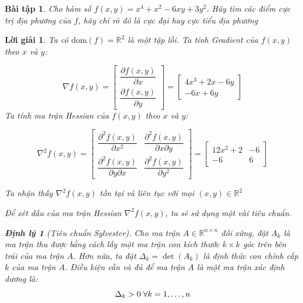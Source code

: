 \documentclass[14pt, a4paper]{article}
\newtheorem{dl}{Định lý}
\theoremstyle{sltheorem}
\newtheorem{baitap}{Bài tập}
\theoremstyle{soltheorem}
\newtheorem*{loigiai}{Lời giải}
\begin{document}
    \begin{baitap}
        Cho hàm số $f(x, y) = x^4 + x^2 - 6xy + 3y^2$. Hãy tìm các điểm cực trị địa phương của $f$, hãy chỉ rõ đó là cực đại hay cực tiểu địa phương
    \end{baitap}

    \begin{loigiai}
        Ta có $\mathrm{dom}(f)=\mathbb{R}^2$ là một tập lồi. Ta tính Gradient của $f(x, y)$ theo $x$ và $y$:

        \begin{equation*}
            \nabla f(x, y) = \begin{bmatrix} \dfrac{\partial f(x, y)}{\partial x} \\ \dfrac{\partial f(x, y)}{\partial y}\end{bmatrix} = \begin{bmatrix} 4x^3 + 2x - 6y \\ -6x + 6y \end{bmatrix}
        \end{equation*}
        Ta tính ma trận Hessian của $f(x, y)$ theo $x$ và $y$:

        \begin{equation*}
            \nabla^2 f(x,y)=\begin{bmatrix} \dfrac{\partial^2 f(x, y)}{\partial x^2} & \dfrac{\partial^2 f(x, y)}{\partial x\partial y} \\ \dfrac{\partial^2 f(x, y)}{\partial y \partial x } & \dfrac{\partial^2 f(x, y)}{\partial y^2 } \end{bmatrix}=\begin{bmatrix} 12x^2 + 2 & -6 \\ -6 & 6 \end{bmatrix}
        \end{equation*}

        Ta nhận thấy $\nabla^2 f(x, y)$ tồn tại và liên tục với mọi $(x, y) \in \mathbb{R}^{2}$

        Để xét dấu của ma trận Hessian $\nabla^2 f(x, y)$, ta sẽ sử dụng một vài tiêu chuẩn.

        \begin{dl}[Tiêu chuẩn Sylvester] \label{dl:Sylvester}
            Cho ma trận $A \in \mathbb{R}^{n \times n}$ đối xứng, 
            đặt $A_k$ là ma trận thu được bằng cách lấy một ma trận con kích thước $k\times k$ góc trên bên trái của ma trận $A$. 
            Hơn nữa, ta đặt $\Delta_k=\det(A_k)$ là định thức con chính cấp $k$ của ma trận $A$.
            Điều kiện cần và đủ để ma trận $A$ là một ma trận xác định dương là:
            \begin{equation*}
                \Delta_k > 0 \thickspace \forall k = 1,\dots,n
            \end{equation*}
        \end{dl}


\end{loigiai}
\end{document}
